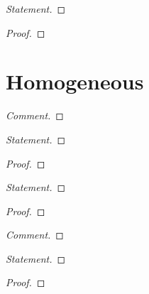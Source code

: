 
\begin{proof}[Statement]\renewcommand{\qedsymbol}{}

\end{proof}
\begin{proof}[Proof]\renewcommand{\qedsymbol}{}

\end{proof}


\section*{Homogeneous}


\begin{proof}[Comment]\renewcommand{\qedsymbol}{}

\end{proof}


\begin{proof}[Statement]\renewcommand{\qedsymbol}{}

\end{proof}
\begin{proof}[Proof]\renewcommand{\qedsymbol}{}

\end{proof}


\begin{proof}[Statement]\renewcommand{\qedsymbol}{}

\end{proof}
\begin{proof}[Proof]\renewcommand{\qedsymbol}{}

\end{proof}


\begin{proof}[Comment]\renewcommand{\qedsymbol}{}

\end{proof}


\begin{proof}[Statement]\renewcommand{\qedsymbol}{}

\end{proof}
\begin{proof}[Proof]\renewcommand{\qedsymbol}{}

\end{proof}

